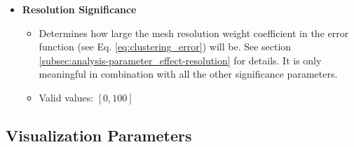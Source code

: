 \begin{itemize}
\item {\bf Resolution Significance} 
	\begin{itemize}
		\item Determines how large the mesh resolution weight coefficient in the error function (see Eq. \ref{eq:clustering_error}) will be. See section \ref{subsec:analysis-parameter_effect-resolution} for details. It is only meaningful in combination with all the other significance parameters\footnotemark.
		\item Valid values: \([0,100]\)
	\end{itemize}
\end{itemize}

\addtocounter{footnote}{-4}

\subsection{Visualization Parameters}
\label{attch:parameter_desc-visualization_parameters}

